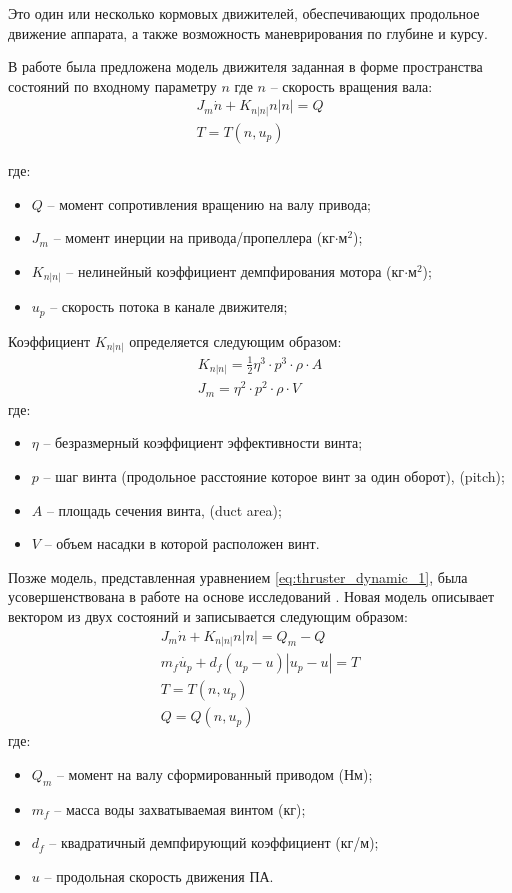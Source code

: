 Это один или несколько кормовых движителей, обеспечивающих продольное движение аппарата, а также возможность маневрирования по глубине и курсу.

В работе \cite{10.1109/48.107145} была предложена модель движителя заданная в форме пространства состояний по входному параметру $n$ где $n$ -- скорость вращения вала:
\begin{gather}
    \label{eq:thruster_dynamic_1}
    J_m\dot{n} + K_{n|n|}n|n| = Q \\
    T = T(n, u_p)
\end{gather}

\noindent где:
\begin{itemize}
    \item $Q$ -- момент сопротивления вращению на валу привода;
    \item $J_m$ -- момент инерции на привода/пропеллера (кг$\cdot$м$^2$);
    \item $K_{n|n|}$ -- нелинейный коэффициент демпфирования мотора (кг$\cdot$м$^2$);
    \item $u_p$ -- скорость потока в канале движителя;
\end{itemize}

Коэффициент $K_{n|n|}$ определяется следующим образом:
\begin{gather}
    K_{n|n|} = \frac{1}{2}\eta^3 \cdot p^3 \cdot \rho \cdot A \\
    J_m = \eta^2 \cdot p^2 \cdot \rho \cdot V
\end{gather}
где:
\begin{itemize}
    \item $\eta$ -- безразмерный коэффициент эффективности винта;
    \item $p$ -- шаг винта (продольное расстояние которое винт за один оборот), (pitch);
    \item $A$ -- площадь сечения винта, (duct area);
    \item $V$ -- объем насадки в которой расположен винт.
\end{itemize}

Позже модель, представленная уравнением \ref{eq:thruster_dynamic_1}, была усовершенствована в работе \cite{10.1109/48.468242} на основе исследований \cite{cody1992experimental, mclean1991dynamic}.
Новая модель описывает вектором из двух состояний и записывается следующим образом:
\begin{gather}
    J_m\dot{n} + K_{n|n|}n|n| = Q_m- Q \\
    m_f \dot{u_p} + d_f(u_p-u) |u_p - u| = T \\
    T = T(n,u_p) \\
    Q = Q(n,u_p)
\end{gather}
\noindent где:
\begin{itemize}
    \item $Q_m$ -- момент на валу сформированный приводом (Нм);
    \item $m_f$ -- масса воды захватываемая винтом (кг);
    \item $d_f$ -- квадратичный демпфирующий коэффициент (кг/м);
    \item $u$ -- продольная скорость движения ПА.
\end{itemize}

